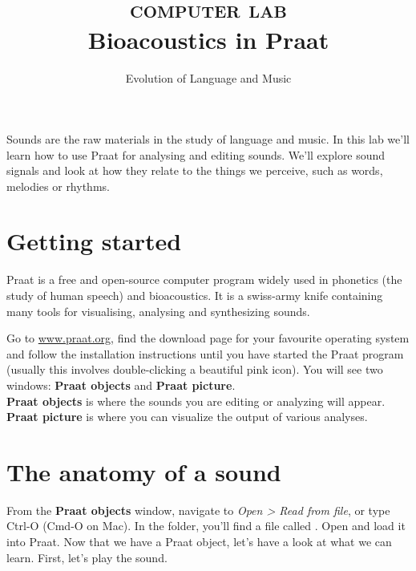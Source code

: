 \documentclass[a4paper, 9pt]{article}
\title{\textsc{computer lab}\\ \textbf{Bioacoustics in Praat}}
\author{Evolution of Language and Music}
\date{}
\begin{document}
\maketitle
{}

\begin{goals}
Sounds are the raw materials in the study of language and music. In this
lab we'll learn how to use Praat for analysing and editing sounds. We'll
explore sound signals and look at how they relate to the things we
perceive, such as words, melodies or rhythms.
\end{goals}

\section{Getting started}\label{getting-started}

Praat is a free and open-source computer program widely used in
phonetics (the study of human speech) and bioacoustics. It is a
swiss-army knife containing many tools for visualising, analysing and
synthesizing sounds.

\begin{exercise}
  \action Go to \url{www.praat.org}, find the download page for your favourite operating system and follow the installation instructions until you have started the Praat program (usually this involves double-clicking a beautiful pink icon).
  \action You will see two windows: \textbf{Praat objects} and \textbf{Praat
  picture}. \\
  \textbf{Praat objects} is where the sounds you are editing or
  analyzing will appear. \textbf{Praat picture} is where you can visualize
  the output of various analyses.
\end{exercise}


\section{The anatomy of a sound}\label{the-anatomy-of-a-sound}

From the \textbf{Praat objects} window, navigate to \emph{Open
> Read from file}, or type Ctrl-O (Cmd-O on Mac). In the 
folder, you'll find a file called . Open and load it into
Praat. Now that we have a Praat object, let's have a look at what we can
learn. First, let's play the sound.
\end{document}
